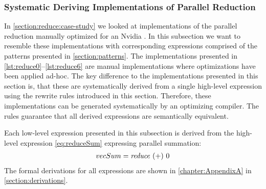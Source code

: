 \subsubsection{Systematic Deriving Implementations of Parallel Reduction}

In \autoref{section:reduce:case-study} we looked at implementations of the parallel reduction manually optimized for an Nvidia \GPU.
In this subsection we want to resemble these implementations with corresponding expressions comprised of the patterns presented in \autoref{section:patterns}.
The implementations presented in \autoref{lst:reduce0}--\autoref{lst:reduce6} are manual implementations where optimizations have been applied ad-hoc.
The key difference to the implementations presented in this section is, that these are systematically derived from a single high-level expression using the rewrite rules introduced in this section.
Therefore, these implementations can be generated systematically by an optimizing compiler.
The rules guarantee that all derived expressions are semantically equivalent.

Each \OpenCL low-level expression presented in this subsection is derived from the high-level expression \autoref{eq:reduceSum} expressing parallel summation:
\begin{align}
  vecSum = \text{\textit{reduce}}\ (+)\ 0
  \label{eq:reduceSum}
\end{align}
%
The formal derivations for all expressions are shown in \autoref{chapter:AppendixA} in \autoref{section:derivations}.

